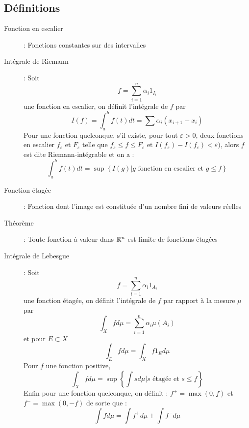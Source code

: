 \subsection{Définitions}
\begin{description}
\item[Fonction en escalier] : Fonctions constantes sur des intervalles
\item[Intégrale de Riemann] : Soit 
    \[ f=\sum_{i=1}^n \alpha_i1_{I_i} \]
    une fonction en escalier,
    on définit l'intégrale de $f$ par
    \[
        I(f)=\int_a^bf(t)dt=\sum\alpha_i(x_{i+1}-x_i)
    \]
    Pour une fonction quelconque, s’il existe, pour tout $\varepsilon > 0$, deux fonctions en escalier $f_\varepsilon$ et $F_\varepsilon$ telle que
    $f_\varepsilon \le f \le F_\varepsilon$
    et
    $I(f_\varepsilon ) - I(f_\varepsilon ) < \varepsilon)$, alors $f$ est dite Riemann-intégrable et on a :
    \[
        \int_a^bf(t)dt=
        \sup\left\{
        I(g) | g\textrm{ fonction en escalier et }
        g \le f    
        \right\}
    \]
\item[Fonction étagée] : Fonction dont l’image est constituée d’un nombre fini de valeurs réelles
\item[Théorème] : Toute fonction à valeur dans $\mathbb{R}^n$ est limite de fonctions étagées
\item[Intégrale de Lebesgue] : Soit
    \[ f=\sum_{i=1}^n \alpha_i1_{A_i} \]
    une fonction étagée, on définit l’intégrale de $f$ par rapport à la mesure $\mu$ par
    \[
        \int_Xfd\mu=\sum_{i=1}^n\alpha_i\mu(A_i)
    \]
    et pour $E\subset X$
    \[ \int_Efd\mu=\int_Xf1_Ed\mu \]
    Pour $f$ une fonction positive,
    \[
        \int_Xfd\mu=\sup\left\{
            \int sd\mu|s\textrm{ étagée et } s\le f
        \right\}
    \]
    Enfin pour une fonction quelconque, on définit :
    $f^+ = \max(0, f)$ et $f^- = \max(0,-f)$ de sorte que :
    \[ \int fd\mu=\int f^+d\mu+\int f^-d\mu \]

\end{description}
